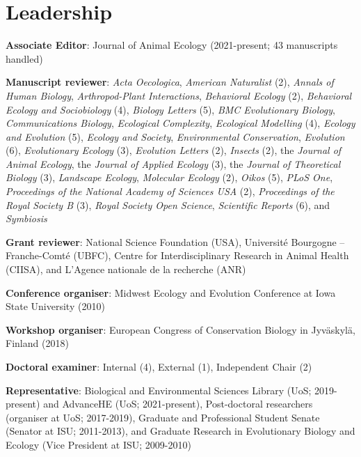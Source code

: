 \documentclass[letterpaper]{article}
\renewenvironment{itemize}{
  \begin{list}{}{
    \setlength{\leftmargin}{1.5em}
  }
}{
  \end{list}
}
\begin{document}
\section*{Leadership}
\begin{itemize}
\item {\bf Associate Editor}: Journal of Animal Ecology (2021-present; 43 manuscripts handled)
\item {\bf Manuscript reviewer}: {\it Acta Oecologica}, {\it American Naturalist} (2), {\it Annals of Human Biology}, {\it Arthropod-Plant Interactions}, {\it Behavioral Ecology} (2), {\it Behavioral Ecology and Sociobiology} (4), {\it Biology Letters} (5), {\it BMC Evolutionary Biology}, {\it Communications Biology}, {\it Ecological Complexity}, {\it Ecological Modelling} (4), {\it Ecology and Evolution} (5), {\it Ecology and Society}, {\it Environmental Conservation}, {\it Evolution} (6), {\it Evolutionary Ecology} (3), {\it Evolution Letters} (2), {\it Insects} (2), the {\it Journal of Animal Ecology}, the {\it Journal of Applied Ecology} (3), the {\it Journal of Theoretical Biology} (3), {\it Landscape Ecology}, {\it Molecular Ecology} (2), {\it Oikos} (5), {\it PLoS One}, {\it Proceedings of the National Academy of Sciences USA} (2), {\it Proceedings of the Royal Society B} (3), {\it Royal Society Open Science}, {\it Scientific Reports} (6), and {\it Symbiosis}
\item {\bf Grant reviewer}: National Science Foundation (USA), Universit\'{e} Bourgogne -- Franche-Comt\'{e} (UBFC), Centre for Interdisciplinary Research in Animal Health (CIISA), and L'Agence nationale de la recherche (ANR)
\item {\bf Conference organiser}: Midwest Ecology and Evolution Conference at Iowa State University (2010)
\item {\bf Workshop organiser}: European Congress of Conservation Biology in Jyv\"{a}skyl\"{a}, Finland (2018)
\item {\bf Doctoral examiner}: Internal (4), External (1), Independent Chair (2)
\item {\bf Representative}: Biological and Environmental Sciences Library (UoS; 2019-present) and AdvanceHE (UoS; 2021-present), Post-doctoral researchers (organiser at UoS; 2017-2019), Graduate and Professional Student Senate (Senator at ISU; 2011-2013), and Graduate Research in Evolutionary Biology and Ecology (Vice President at ISU; 2009-2010)
\end{itemize}
\end{document}
